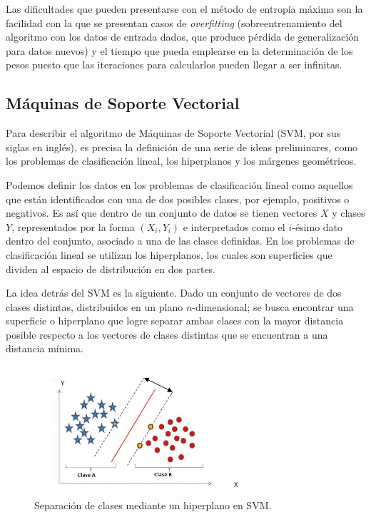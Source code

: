 {Las dificultades que pueden presentarse con el m\'etodo de entrop\'ia m\'axima son la facilidad con la que se presentan casos de \textit{overfitting} (sobreentrenamiento del algoritmo con los datos de entrada dados, que produce p\'erdida de generalizaci\'on para datos nuevos) y el tiempo que pueda emplearse en la determinaci\'on de los pesos puesto que las iteraciones para calcularlos pueden llegar a ser infinitas.
\newline

\subsection{M\'aquinas de Soporte Vectorial} \label{sec:svm}

Para describir el algoritmo de M\'aquinas de Soporte Vectorial (SVM, por sus siglas en ingl\'es), es precisa la definici\'on de una serie de ideas preliminares, como los problemas de clasificaci\'on lineal, los hiperplanos y los m\'argenes geom\'etricos.
\newline

Podemos definir los datos en los problemas de clasificaci\'on lineal como aquellos que est\'an identificados con una de dos posibles clases, por ejemplo, positivos o negativos. Es as\'i que dentro de un conjunto de datos se tienen vectores $X$ y clases $Y$, representados por la forma $(X_{i},Y_{i})$ e interpretados como el $i$-\'esimo dato dentro del conjunto, asociado a una de las clases definidas. En los problemas de clasificaci\'on lineal se utilizan los hiperplanos, los cuales son superficies que dividen al espacio de distribuci\'on en dos partes.
\newline

La idea detr\'as del SVM es la siguiente. Dado un conjunto de vectores de dos clases distintas, distribuidos en un plano $n$-dimensional; se busca encontrar una superficie o hiperplano que logre separar ambas clases con la mayor distancia posible respecto a los vectores de clases distintas que se encuentran a una distancia m\'inima.
\newline

\begin{figure}[h]
\centering
\includegraphics[width=0.7\textwidth]{separacion_hiper.png}
\caption{Separaci\'on de clases mediante un hiperplano en SVM.}
\label{svm:separacion_hiper}
\end{figure}

}

